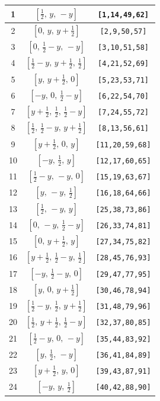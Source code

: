 \documentclass[fleqn,8pt]{jsarticle}
\begin{document}
\begin{longtable}{ccc}
1 & $\left[ \frac{1}{2},\, y,\, - y \right]$ & {\tt [1,14,49,62]} \\ \hline
2 & $\left[ 0,\, y,\, y + \frac{1}{2} \right]$ & {\tt [2,9,50,57]} \\ \hline
3 & $\left[ 0,\, \frac{1}{2} - y,\, - y \right]$ & {\tt [3,10,51,58]} \\ \hline
4 & $\left[ \frac{1}{2} - y,\, y + \frac{1}{2},\, \frac{1}{2} \right]$ & {\tt [4,21,52,69]} \\ \hline
5 & $\left[ y,\, y + \frac{1}{2},\, 0 \right]$ & {\tt [5,23,53,71]} \\ \hline
6 & $\left[ - y,\, 0,\, \frac{1}{2} - y \right]$ & {\tt [6,22,54,70]} \\ \hline
7 & $\left[ y + \frac{1}{2},\, \frac{1}{2},\, \frac{1}{2} - y \right]$ & {\tt [7,24,55,72]} \\ \hline
8 & $\left[ \frac{1}{2},\, \frac{1}{2} - y,\, y + \frac{1}{2} \right]$ & {\tt [8,13,56,61]} \\ \hline
9 & $\left[ y + \frac{1}{2},\, 0,\, y \right]$ & {\tt [11,20,59,68]} \\ \hline
10 & $\left[ - y,\, \frac{1}{2},\, y \right]$ & {\tt [12,17,60,65]} \\ \hline
11 & $\left[ \frac{1}{2} - y,\, - y,\, 0 \right]$ & {\tt [15,19,63,67]} \\ \hline
12 & $\left[ y,\, - y,\, \frac{1}{2} \right]$ & {\tt [16,18,64,66]} \\ \hline
13 & $\left[ \frac{1}{2},\, - y,\, y \right]$ & {\tt [25,38,73,86]} \\ \hline
14 & $\left[ 0,\, - y,\, \frac{1}{2} - y \right]$ & {\tt [26,33,74,81]} \\ \hline
15 & $\left[ 0,\, y + \frac{1}{2},\, y \right]$ & {\tt [27,34,75,82]} \\ \hline
16 & $\left[ y + \frac{1}{2},\, \frac{1}{2} - y,\, \frac{1}{2} \right]$ & {\tt [28,45,76,93]} \\ \hline
17 & $\left[ - y,\, \frac{1}{2} - y,\, 0 \right]$ & {\tt [29,47,77,95]} \\ \hline
18 & $\left[ y,\, 0,\, y + \frac{1}{2} \right]$ & {\tt [30,46,78,94]} \\ \hline
19 & $\left[ \frac{1}{2} - y,\, \frac{1}{2},\, y + \frac{1}{2} \right]$ & {\tt [31,48,79,96]} \\ \hline
20 & $\left[ \frac{1}{2},\, y + \frac{1}{2},\, \frac{1}{2} - y \right]$ & {\tt [32,37,80,85]} \\ \hline
21 & $\left[ \frac{1}{2} - y,\, 0,\, - y \right]$ & {\tt [35,44,83,92]} \\ \hline
22 & $\left[ y,\, \frac{1}{2},\, - y \right]$ & {\tt [36,41,84,89]} \\ \hline
23 & $\left[ y + \frac{1}{2},\, y,\, 0 \right]$ & {\tt [39,43,87,91]} \\ \hline
24 & $\left[ - y,\, y,\, \frac{1}{2} \right]$ & {\tt [40,42,88,90]} \\
\end{longtable}
\end{document}
